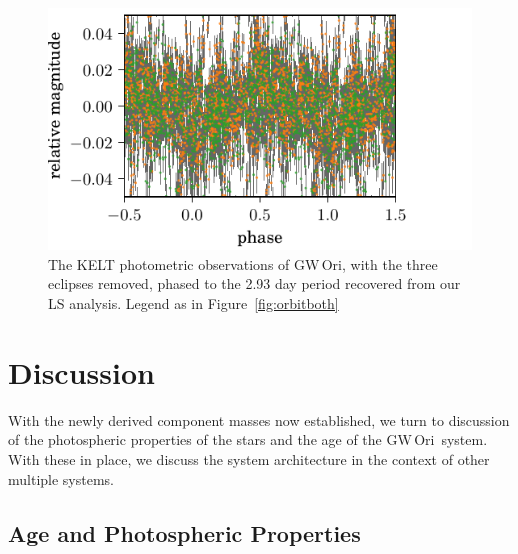 \documentclass[twocolumn]{aastex61}
\newcommand{\obj}{GW\,Ori}
\begin{document}
\begin{figure}[!ht]
\includegraphics{rotation-phased.pdf}
\caption{The KELT photometric observations of \obj, with the three eclipses removed, phased to the 2.93 day period recovered from our LS analysis. Legend as in Figure~\ref{fig:orbitboth}}
\label{fig:phased}
\end{figure}




\section{Discussion} \label{sec:discussion}

With the newly derived component masses now established, we turn to discussion of the photospheric properties of the stars and the age of the \obj\ system. With these in place, we discuss the system architecture in the context of other multiple systems.



\subsection{Age and Photospheric Properties}
\end{document}
